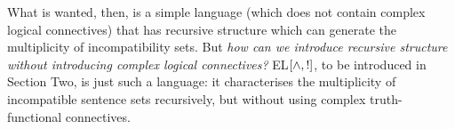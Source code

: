 What is wanted, then, is a simple language (which does not contain complex logical connectives) that has recursive structure which can generate the multiplicity of incompatibility sets.
But \emph{how can we introduce recursive structure without introducing complex logical connectives?} EL$[\land, !]$, to be introduced in Section Two, is just such a language: it characterises the multiplicity of incompatible sentence sets recursively, but without using complex truth-functional connectives.

